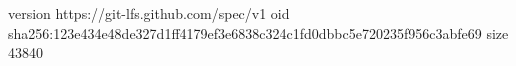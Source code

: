 version https://git-lfs.github.com/spec/v1
oid sha256:123e434e48de327d1ff4179ef3e6838c324c1fd0dbbc5e720235f956c3abfe69
size 43840

